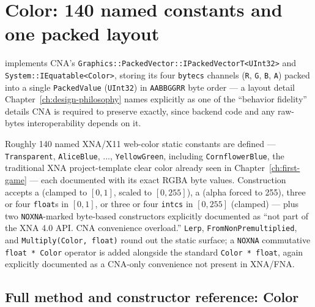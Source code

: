 \section{Color: 140 named constants and one packed layout}

 implements CNA's \texttt{Graphics::PackedVector::IPackedVectorT<UInt32>}
and \texttt{System::IEquatable<Color>}, storing its four \texttt{bytecs} channels
(\texttt{R}, \texttt{G}, \texttt{B}, \texttt{A}) packed into a single \texttt{PackedValue}
(\texttt{UInt32}) in \texttt{AABBGGRR} byte order --- a layout detail
Chapter~\ref{ch:design-philosophy} names explicitly as one of the ``behavior fidelity''
details CNA is required to preserve exactly, since backend code and any raw-bytes
interoperability depends on it.

Roughly 140 named XNA/X11 web-color static constants are defined --- \texttt{Transparent},
\texttt{AliceBlue}, ..., \texttt{YellowGreen}, including \texttt{CornflowerBlue}, the
traditional XNA project-template clear color already seen in
Chapter~\ref{ch:first-game} --- each documented with its exact RGBA byte values. Construction
accepts a  (clamped to $[0,1]$, scaled to $[0,255]$), a 
(alpha forced to 255), three or four \texttt{float}s in $[0,1]$, or three or four
\texttt{intcs} in $[0,255]$ (clamped) --- plus two \texttt{NOXNA}-marked byte-based
constructors explicitly documented as ``not part of the XNA 4.0 API. CNA convenience
overload.'' \texttt{Lerp}, \texttt{FromNonPremultiplied}, and \texttt{Multiply(Color,
float)} round out the static surface; a \texttt{NOXNA} commutative \texttt{float * Color}
operator is added alongside the standard \texttt{Color * float}, again explicitly documented
as a CNA-only convenience not present in XNA/FNA.

\subsection{Full method and constructor reference: Color}

